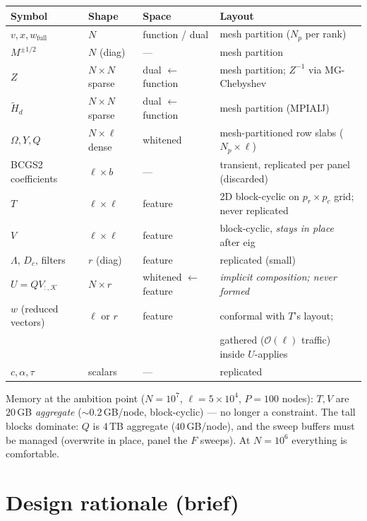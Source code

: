 \documentclass[11pt]{article}
\newcommand{\Hd}{\widetilde{H}_d}
\begin{document}
\begin{center}
\begin{tabular}{llll}
\toprule
Symbol & Shape & Space & Layout \\
\midrule
$v, x, w_{\mathrm{full}}$ & $N$ & function / dual & mesh partition ($N_p$ per rank) \\
$M^{\pm 1/2}$ & $N$ (diag) & --- & mesh partition \\
$Z$ & $N \times N$ sparse & dual $\leftarrow$ function & mesh partition; $Z^{-1}$ via MG-Chebyshev \\
$\Hd$ & $N \times N$ sparse & dual $\leftarrow$ function & mesh partition (MPIAIJ) \\
$\Omega, Y, Q$ & $N \times \ell$ dense & whitened & mesh-partitioned row slabs ($N_p \times \ell$) \\
BCGS2 coefficients & $\ell \times b$ & --- & transient, replicated per panel (discarded) \\
$T$ & $\ell \times \ell$ & feature & 2D block-cyclic on $p_r \times p_c$ grid; never replicated \\
$V$ & $\ell \times \ell$ & feature & block-cyclic, \emph{stays in place} after eig \\
$\Lambda$, $D_c$, filters & $r$ (diag) & feature & replicated (small) \\
$U = Q V_{:,\mathcal{K}}$ & $N \times r$ & whitened $\leftarrow$ feature & \emph{implicit composition; never formed} \\
$w$ (reduced vectors) & $\ell$ or $r$ & feature & conformal with $T$'s layout; \\
 & & & gathered ($\mathcal{O}(\ell)$ traffic) inside $U$-applies \\
$c, \alpha, \tau$ & scalars & --- & replicated \\
\bottomrule
\end{tabular}
\end{center}

Memory at the ambition point ($N = 10^7$, $\ell = 5\times 10^4$, $P = 100$ nodes):
$T, V$ are $20\,$GB \emph{aggregate} ($\sim$0.2\,GB/node, block-cyclic) --- no longer
a constraint.  The tall blocks dominate: $Q$ is $4\,$TB aggregate ($40\,$GB/node),
and the sweep buffers must be managed (overwrite in place, panel the $F$ sweeps).
At $N = 10^6$ everything is comfortable.

\section{Design rationale (brief)}
\end{document}
